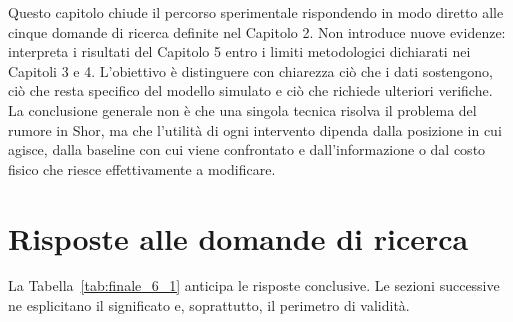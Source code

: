

\iffalse

Questo capitolo chiude il percorso sperimentale rispondendo in modo diretto alle cinque domande di ricerca definite nel Capitolo 2. Non introduce nuove evidenze: interpreta i risultati del Capitolo 5 entro i limiti metodologici dichiarati nei Capitoli 3 e 4. L'obiettivo è distinguere con chiarezza ciò che i dati sostengono, ciò che resta specifico del modello simulato e ciò che richiede ulteriori verifiche. La conclusione generale non è che una singola tecnica risolva il problema del rumore in Shor, ma che l'utilità di ogni intervento dipenda dalla posizione in cui agisce, dalla baseline con cui viene confrontato e dall'informazione o dal costo fisico che riesce effettivamente a modificare.

\section{Risposte alle domande di ricerca}\label{sec:finale_6_1}

La Tabella~\ref{tab:finale_6_1} anticipa le risposte conclusive. Le sezioni successive ne esplicitano il significato e, soprattutto, il perimetro di validità.

